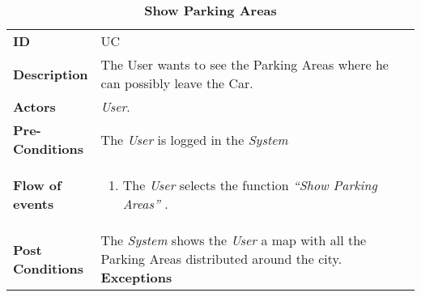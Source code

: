 \begin{longtable}{|p{0.2\linewidth} p{0.8\linewidth}|}
	\captionsetup{labelformat=empty} %
	\caption{\textbf{Show Parking Areas}} %
	\label{UC_Logout}%
	\\ \hline %
	
	\textbf{ID} & UC\theUseCaseIdCounter \\ \hline
	\textbf{Description} & The User wants to see the Parking Areas where he can possibly leave the Car. \\ \hline
	\textbf{Actors} & \emph{User}.\\ \hline
	\textbf{Pre-Conditions} & The \emph{User} is logged in the \emph{System} \\ \hline
	\textbf{Flow of events} & 
	\begin{enumerate}
		\item The \emph{User} selects the function \textit{\textquotedblleft{Show Parking Areas}\textquotedblright} .
	\end{enumerate}	 \\ \hline
	\textbf{Post Conditions} & The \emph{System} shows the \emph{User} a map with all the Parking Areas distributed around the city.
	\textbf{Exceptions} &  \\
	\hline
\end{longtable}

